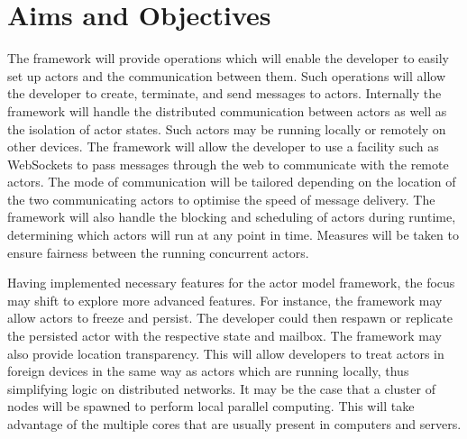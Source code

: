 \documentclass[12pt]{report}
\begin{document}
\section{Aims and Objectives}
The framework will provide operations which will enable the developer to easily set up actors and the communication between them. Such operations will allow the developer to create, terminate, and send messages to actors. Internally the framework will handle the distributed communication between actors as well as the isolation of actor states. Such actors may be running locally or remotely on other devices. The framework will allow the developer to use a facility such as WebSockets to pass messages through the web to communicate with the remote actors. The mode of communication will be tailored depending on the location of the two communicating actors to optimise the speed of message delivery. The framework will also handle the blocking and scheduling of actors during runtime, determining which actors will run at any point in time. Measures will be taken to ensure fairness between the running concurrent actors.

Having implemented necessary features for the actor model framework, the focus may shift to explore more advanced features. For instance, the framework may allow actors to freeze and persist. The developer could then respawn or replicate the persisted actor with the respective state and mailbox. The framework may also provide location transparency. This will allow developers to treat actors in foreign devices in the same way as actors which are running locally, thus simplifying logic on distributed networks. It may be the case that a cluster of nodes will be spawned to perform local parallel computing. This will take advantage of the multiple cores that are usually present in computers and servers.
\end{document}

